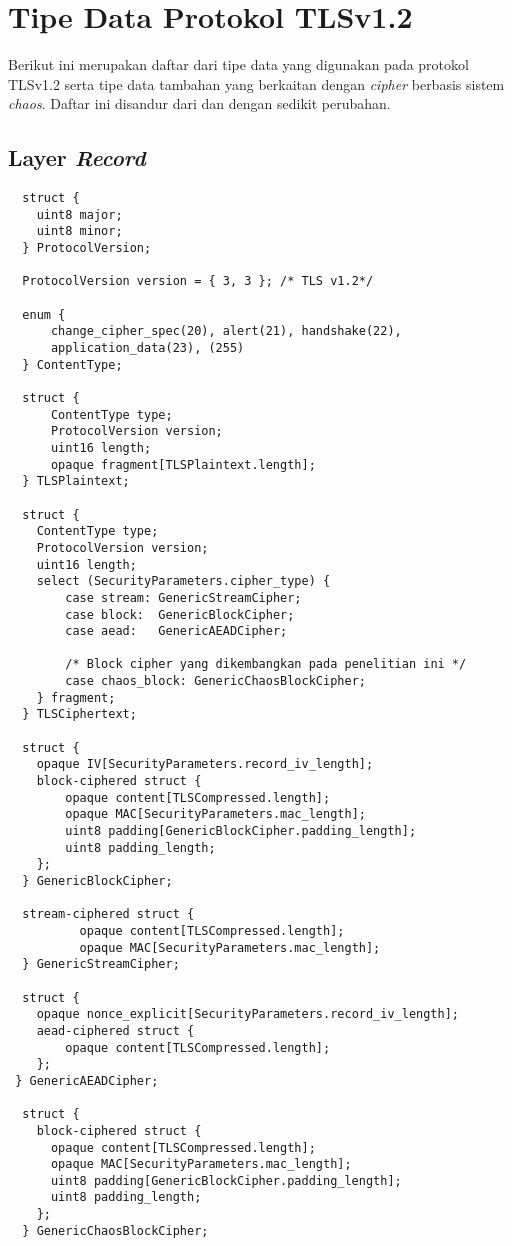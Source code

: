 \chapter{{{Tipe Data Protokol TLSv1.2}}} 
\label{appendix:tls12.datatype}

Berikut ini merupakan daftar dari tipe data yang digunakan pada protokol TLSv1.2 serta tipe data tambahan yang berkaitan dengan \emph{cipher} berbasis sistem \emph{chaos}. Daftar ini disandur dari \textcite{rfc5246} dan \textcite{rfc4492} dengan sedikit perubahan.

\section{Layer \emph{Record}}

\begin{verbatim}
  struct {
    uint8 major;
    uint8 minor;
  } ProtocolVersion;

  ProtocolVersion version = { 3, 3 }; /* TLS v1.2*/

  enum {
      change_cipher_spec(20), alert(21), handshake(22),
      application_data(23), (255)
  } ContentType;

  struct {
      ContentType type;
      ProtocolVersion version;
      uint16 length;
      opaque fragment[TLSPlaintext.length];
  } TLSPlaintext;

  struct {
    ContentType type;
    ProtocolVersion version;
    uint16 length;
    select (SecurityParameters.cipher_type) {
        case stream: GenericStreamCipher;
        case block:  GenericBlockCipher;
        case aead:   GenericAEADCipher;

        /* Block cipher yang dikembangkan pada penelitian ini */
        case chaos_block: GenericChaosBlockCipher;
    } fragment;
  } TLSCiphertext;

  struct {
    opaque IV[SecurityParameters.record_iv_length];
    block-ciphered struct {
        opaque content[TLSCompressed.length];
        opaque MAC[SecurityParameters.mac_length];
        uint8 padding[GenericBlockCipher.padding_length];
        uint8 padding_length;
    };
  } GenericBlockCipher;

  stream-ciphered struct {
          opaque content[TLSCompressed.length];
          opaque MAC[SecurityParameters.mac_length];
  } GenericStreamCipher;
  
  struct {
    opaque nonce_explicit[SecurityParameters.record_iv_length];
    aead-ciphered struct {
        opaque content[TLSCompressed.length];
    };
 } GenericAEADCipher;

  struct {
    block-ciphered struct {
      opaque content[TLSCompressed.length];
      opaque MAC[SecurityParameters.mac_length];
      uint8 padding[GenericBlockCipher.padding_length];
      uint8 padding_length;
    };
  } GenericChaosBlockCipher;


\end{verbatim}


